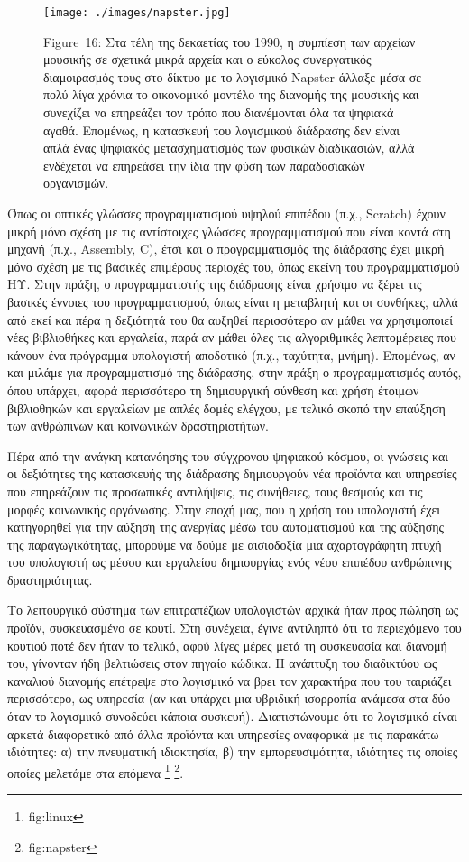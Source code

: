 \documentclass[
]{article}
\begin{document}
\leavevmode{}%
\begin{figure}
\hypertarget{fig:napster}{%
\centering
\texttt{[image: ./images/napster.jpg]}
\caption{Figure~16: Στα τέλη της δεκαετίας του 1990, η συμπίεση των
αρχείων μουσικής σε σχετικά μικρά αρχεία και ο εύκολος συνεργατικός
διαμοιρασμός τους στο δίκτυο με το λογισμικό Napster άλλαξε μέσα σε πολύ
λίγα χρόνια το οικονομικό μοντέλο της διανομής της μουσικής και
συνεχίζει να επηρεάζει τον τρόπο που διανέμονται όλα τα ψηφιακά αγαθά.
Επομένως, η κατασκευή του λογισμικού διάδρασης δεν είναι απλά ένας
ψηφιακός μετασχηματισμός των φυσικών διαδικασιών, αλλά ενδέχεται να
επηρεάσει την ίδια την φύση των παραδοσιακών
οργανισμών.}\label{fig:napster}
}
\end{figure}

Όπως οι οπτικές γλώσσες προγραμματισμού υψηλού επιπέδου (π.χ., Scratch)
έχουν μικρή μόνο σχέση με τις αντίστοιχες γλώσσες προγραμματισμού που
είναι κοντά στη μηχανή (π.χ., Assembly, C), έτσι και ο προγραμματισμός
της διάδρασης έχει μικρή μόνο σχέση με τις βασικές επιμέρους περιοχές
του, όπως εκείνη του προγραμματισμού ΗΥ. Στην πράξη, ο προγραμματιστής
της διάδρασης είναι χρήσιμο να ξέρει τις βασικές έννοιες του
προγραμματισμού, όπως είναι η μεταβλητή και οι συνθήκες, αλλά από εκεί
και πέρα η δεξιότητά του θα αυξηθεί περισσότερο αν μάθει να χρησιμοποιεί
νέες βιβλιοθήκες και εργαλεία, παρά αν μάθει όλες τις αλγοριθμικές
λεπτομέρειες που κάνουν ένα πρόγραμμα υπολογιστή αποδοτικό (π.χ.,
ταχύτητα, μνήμη). Επομένως, αν και μιλάμε για προγραμματισμό της
διάδρασης, στην πράξη ο προγραμματισμός αυτός, όπου υπάρχει, αφορά
περισσότερο τη δημιουργική σύνθεση και χρήση έτοιμων βιβλιοθηκών και
εργαλείων με απλές δομές ελέγχου, με τελικό σκοπό την επαύξηση των
ανθρώπινων και κοινωνικών δραστηριοτήτων.

Πέρα από την ανάγκη κατανόησης του σύγχρονου ψηφιακού κόσμου, οι γνώσεις
και οι δεξιότητες της κατασκευής της διάδρασης δημιουργούν νέα προϊόντα
και υπηρεσίες που επηρεάζουν τις προσωπικές αντιλήψεις, τις συνήθειες,
τους θεσμούς και τις μορφές κοινωνικής οργάνωσης. Στην εποχή μας, που η
χρήση του υπολογιστή έχει κατηγορηθεί για την αύξηση της ανεργίας μέσω
του αυτοματισμού και της αύξησης της παραγωγικότητας, μπορούμε να δούμε
με αισιοδοξία μια αχαρτογράφητη πτυχή του υπολογιστή ως μέσου και
εργαλείου δημιουργίας ενός νέου επιπέδου ανθρώπινης δραστηριότητας.

Το λειτουργικό σύστημα των επιτραπέζιων υπολογιστών αρχικά ήταν προς
πώληση ως προϊόν, συσκευασμένο σε κουτί. Στη συνέχεια, έγινε αντιληπτό
ότι το περιεχόμενο του κουτιού ποτέ δεν ήταν το τελικό, αφού λίγες μέρες
μετά τη συσκευασία και διανομή του, γίνονταν ήδη βελτιώσεις στον πηγαίο
κώδικα. Η ανάπτυξη του διαδικτύου ως καναλιού διανομής επέτρεψε στο
λογισμικό να βρει τον χαρακτήρα που του ταιριάζει περισσότερο, ως
υπηρεσία (αν και υπάρχει μια υβριδική ισορροπία ανάμεσα στα δύο όταν το
λογισμικό συνοδεύει κάποια συσκευή). Διαπιστώνουμε ότι το λογισμικό
είναι αρκετά διαφορετικό από άλλα προϊόντα και υπηρεσίες αναφορικά με
τις παρακάτω ιδιότητες: α) την πνευματική ιδιοκτησία, β) την
εμπορευσιμότητα, ιδιότητες τις οποίες οποίες μελετάμε στα επόμενα
\footnote{fig:linux} \footnote{fig:napster}.
\end{document}
